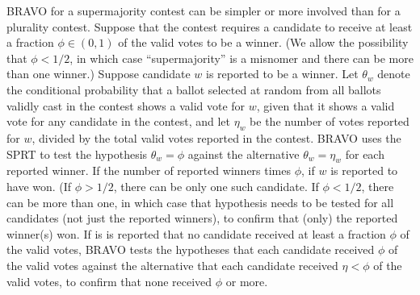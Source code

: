 \documentclass[12pt,runningheads]{llncs}
\begin{document}
{BRAVO for a supermajority contest can be simpler or more involved than for a plurality
contest. 
Suppose that the contest requires a candidate to receive at least a fraction $\phi \in (0, 1)$ of the valid votes
to be a winner.
(We allow the possibility that $\phi < 1/2$, in which case ``supermajority'' is a misnomer and there can be more than one winner.)
Suppose candidate $w$ is reported to be a winner.
Let $\theta_w$ denote the conditional probability that a ballot selected
at random from all ballots validly cast in the contest shows a valid vote for $w$, given that it shows a valid 
vote for any candidate in the contest,
and let $\eta_w$ be the number of votes reported for $w$, divided by the total valid votes reported in the contest.
BRAVO uses the SPRT to test the hypothesis $\theta_w = \phi$ against the alternative $\theta_w = \eta_w$
for each reported winner. 
If the number of reported winners times $\phi$, if $w$ is reported to have won.
(If $\phi > 1/2$, there can be only one such candidate. 
If $\phi < 1/2$, there can be more than one, in which case
that hypothesis needs to be tested for all candidates (not just the reported winners), to confirm that (only) the
reported winner(s) won.
If is is reported that no candidate received at least a fraction $\phi$ of the valid votes,  
BRAVO tests the hypotheses that each candidate received $\phi$ of the valid votes
against the alternative that each candidate received $\eta < \phi$ of the valid votes,
to confirm that none received $\phi$ or more.

}
\end{document}
